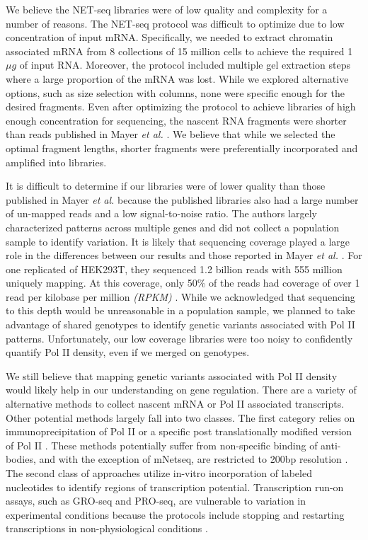We believe the NET-seq libraries were of low quality and complexity for a number of reasons. The NET-seq protocol was difficult to optimize due to low concentration of input mRNA. Specifically, we needed to extract chromatin associated mRNA from 8 collections of 15 million cells to achieve the required 1$\mu g$ of input RNA. Moreover, the protocol included multiple gel extraction steps where a large proportion of the mRNA was lost. While we explored alternative options, such as size selection with columns, none were specific enough for the desired fragments. Even after optimizing the protocol to achieve libraries of high enough concentration for sequencing, the nascent RNA fragments were shorter than reads published in Mayer \emph{et al.} \cite{mayer_native_2015}. We believe that while we selected the optimal fragment lengths, shorter fragments were preferentially incorporated and amplified into libraries. 

It is difficult to determine if our libraries were of lower quality than those published in Mayer \emph{et al.} because the published libraries also had a large number of un-mapped reads and a low signal-to-noise ratio. The authors largely characterized patterns across multiple genes and did not collect a population sample to identify variation. It is likely that sequencing coverage played a large role in the differences between our results and those reported in Mayer \emph{et al.} \cite{mayer_native_2015}. For one replicated of HEK293T, they sequenced 1.2 billion reads with 555 million uniquely mapping. At this coverage, only 50\% of the reads had coverage of over 1 read per kilobase per million \emph{(RPKM)} \cite{mayer_native_2015}. While we acknowledged that sequencing to this depth would be unreasonable in a population sample, we planned to take advantage of shared genotypes to identify genetic variants associated with Pol II patterns. Unfortunately, our low coverage libraries were too noisy to confidently quantify Pol II density, even if we merged on genotypes. 

We still believe that mapping genetic variants associated with Pol II density would likely help in our understanding on gene regulation. There are a variety of alternative methods to collect nascent mRNA or Pol II associated transcripts. Other potential methods largely fall into two classes. The first category relies on immunoprecipitation of Pol II or a specific post translationally modified version of Pol II \citep{nojima_mammalian_2015, gariglio_clustering_1981, buck_chip-chip_2004, kim_high-resolution_2005,wissink_nascent_2019, mayer_pause_2017}. These methods potentially suffer from non-specific binding of anti-bodies, and with the exception of mNetseq, are restricted to 200bp resolution \citep{nojima_mammalian_2015}. The second class of approaches utilize in-vitro incorporation of labeled nucleotides to identify regions of transcription potential. Transcription run-on assays, such as GRO-seq and PRO-seq, are vulnerable to variation in experimental conditions because the protocols include stopping and restarting transcriptions in non-physiological conditions \citep{kwak_precise_2013,core_analysis_2014, tome_single-molecule_2018, gardini_global_2017,mahat_base-pair-resolution_2016, mayer_pause_2017, wissink_nascent_2019}. 


